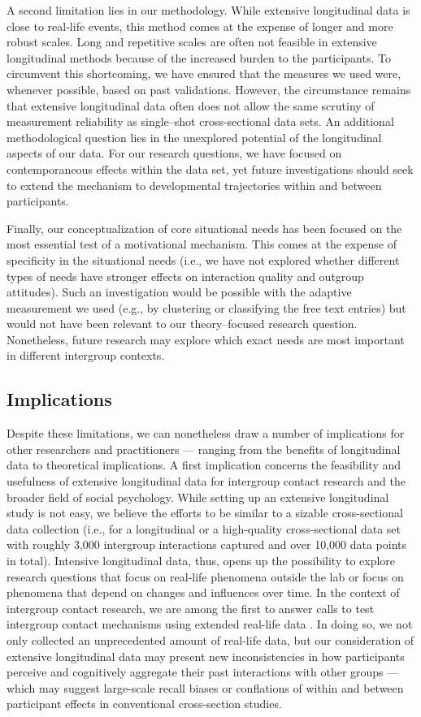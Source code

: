 \documentclass[man, 12pt, a4paper, mask]{apa7}
\theoremstyle{break}
\theoremstyle{plain}
\begin{document}
A second limitation lies in our methodology. While extensive longitudinal data is close to real-life events, this method comes at the expense of longer and more robust scales. Long and repetitive scales are often not feasible in extensive longitudinal methods because of the increased burden to the participants. To circumvent this shortcoming, we have ensured that the measures we used were, whenever possible, based on past validations. However, the circumstance remains that extensive longitudinal data often does not allow the same scrutiny of measurement reliability as single–shot cross-sectional data sets. An additional methodological question lies in the unexplored potential of the longitudinal aspects of our data. For our research questions, we have focused on contemporaneous effects within the data set, yet future investigations should seek to extend the mechanism to developmental trajectories within and between participants. 

Finally, our conceptualization of core situational needs has been focused on the most essential test of a motivational mechanism. This comes at the expense of specificity in the situational needs (i.e., we have not explored whether different types of needs have stronger effects on interaction quality and outgroup attitudes). Such an investigation would be possible with the adaptive measurement we used (e.g., by clustering or classifying the free text entries) but would not have been relevant to our theory–focused research question. Nonetheless, future research may explore which exact needs are most important in different intergroup contexts. 

\subsection{Implications}
Despite these limitations, we can nonetheless draw a number of implications for other researchers and practitioners --- ranging from the benefits of longitudinal data to theoretical implications. A first implication concerns the feasibility and usefulness of extensive longitudinal data for intergroup contact research and the broader field of social psychology. While setting up an extensive longitudinal study is not easy, we believe the efforts to be similar to a sizable cross-sectional data collection (i.e., for a longitudinal or a high-quality cross-sectional data set with roughly 3,000 intergroup interactions captured and over 10,000 data points in total). Intensive longitudinal data, thus, opens up the possibility to explore research questions that focus on real-life phenomena outside the lab or focus on phenomena that depend on changes and influences over time. In the context of intergroup contact research, we are among the first to answer calls to test intergroup contact mechanisms using extended real-life data \citep[e.g.,][]{Pettigrew2011, MacInnis2015}. In doing so, we not only collected an unprecedented amount of real-life data, but our consideration of extensive longitudinal data may present new inconsistencies in how participants perceive and cognitively aggregate their past interactions with other groups — which may suggest large-scale recall biases or conflations of within and between participant effects in conventional cross-section studies.
\end{document}
